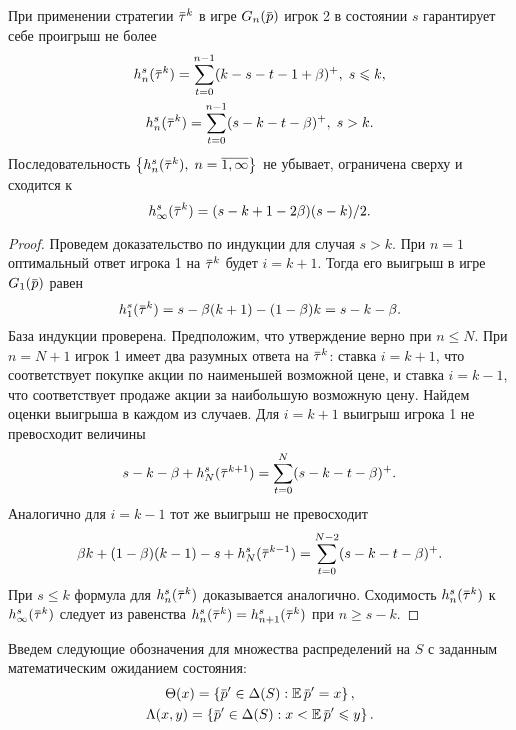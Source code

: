 {\begin{lemma}
  \label{upper-bound:lemma:vector-payoffs}
  При применении стратегии $\tauv^k$ в игре $\theGame(\p)$ игрок 2 в состоянии $s$
  гарантирует себе проигрыш не более
  \begin{gather*}
    h^s_n(\tauv^k) = \sum_{t=0}^{n-1} (k-s-t-1+\beta)^+, \; s \leqslant k, \\
    h^s_n(\tauv^k) = \sum_{t=0}^{n-1} (s-k-t-\beta)^+, \; s > k.
  \end{gather*}
  Последовательность $\left\{ h^s_n(\tauv^k), \; n = \overline{1, \infty}
  \right\}$ не убывает, ограничена сверху и сходится к %
  \begin{equation}
    \label{upper-bound:eq:max-payoff}
    h^s_\infty(\tauv^k) = (s - k + 1 - 2\beta)(s-k)/2.
  \end{equation}
\end{lemma}
\begin{proof}
  Проведем доказательство по индукции для случая $s > k$. При $n = 1$
  оптимальный ответ игрока 1 на $\tauv^k$ будет $i = k + 1$. Тогда его выигрыш в
  игре $\theGame[1](\p)$ равен
  \begin{equation*}
    h^s_1(\tauv^k) = s - \beta(k+1) - (1-\beta)k = s - k - \beta.
  \end{equation*}
  База индукции проверена. Предположим, что утверждение верно при $n \leqslant
  N$. При $n = N + 1$ игрок 1 имеет два разумных ответа на $\tauv^k$: ставка $i
  = k + 1$, что соответствует покупке акции по наименьшей возможной цене, и
  ставка $i = k - 1$, что соответствует продаже акции за наибольшую возможную
  цену. Найдем оценки выигрыша в каждом из случаев. Для $i = k + 1$ выигрыш
  игрока 1 не превосходит величины
  \begin{equation*}
    s - k - \beta + h^s_N(\tauv^{k+1}) = \sum_{t=0}^N(s-k-t-\beta)^+.
  \end{equation*}
  Аналогично для $i = k - 1$ тот же выигрыш не превосходит
  \begin{equation*}
    \beta k + (1-\beta)(k-1) - s + h^s_N(\tauv^{k-1}) = \sum_{t=0}^{N-2}(s-k-t-\beta)^+.
  \end{equation*}
  При $s \leqslant k$ формула для $h^s_n(\tauv^k)$ доказывается аналогично.
  Сходимость $h^s_n(\tauv^k)$ к $h^s_\infty(\tauv^k)$ следует из равенства
  $h^s_n(\tauv^k) = h^s_{n+1}(\tauv^k)$ при $n \geqslant s - k$.
\end{proof}

Введем следующие обозначения для множества распределений на $S$ с заданным
математическим ожиданием состояния:
\begin{gather*}
  \Theta(x) = \left\{ \p' \in \Delta(S): \E \p' = x \right\}, \\
  \Lambda(x, y) = \left\{ \p' \in \Delta(S): x < \E \p' \leqslant y \right\}.
\end{gather*}

}
